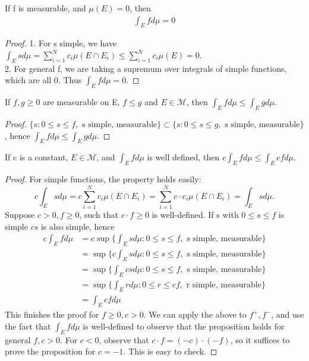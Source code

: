 \documentclass[11pt]{scrartcl}
\begin{document}
\begin{proposition}
If f is measurable, and $\mu(E)=0$, then 
\begin{align*}
\int_E f d\mu = 0 
\end{align*}
\end{proposition}

\begin{proof}
1. For s simple, we have $\int_E s d\mu = \sum_{i=1}^N c_i \mu(E\cap E_i) \leq \sum_{i=1}^N c_i \mu(E) = 0$.\\
2. For general f, we are taking a supremum over integrals of simple functions, which are all 0. Thus $\int_E f d\mu = 0 $.
\end{proof}

\begin{proposition}
If $f,g\geq 0$ are measurable on E, $f\leq g$ and $E\in \mathcal{M}$, then $\int_E f d\mu \leq \int_E g d\mu$.
\end{proposition}

\begin{proof}
$\{s: 0\leq s\leq f, \text{ s simple, measurable}\} \subset \{s: 0\leq s\leq g, \text{ s simple, measurable}\}$, hence $\int_E f d\mu \leq \int_E g d\mu$.
\end{proof}

\begin{proposition}
If c is a constant, $E\in \mathcal{M}$, and $\int_E f d\mu$ is well defined, then $c \int_E f d\mu \leq \int_E c f d\mu$.
\end{proposition}

\begin{proof}
For simple functions, the property holds easily: $$c \int_E s d\mu = c \sum_{i=1}^N c_i \mu(E\cap E_i) = \sum_{i=1}^N c\cdot c_i \mu(E\cap E_i) =\int_E s d\mu .$$
Suppose $c > 0, f\geq 0$, such that $c\cdot f\geq 0$ is well-defined. If s with $0\leq s \leq f$ is simple $cs$ is also simple, hence
\begin{align*}
c\int_E f d\mu & = c \sup \{ \int_E s d\mu: 0\leq s\leq f, \text{ s simple, measurable}\} \\
& = \sup \{ c \int_E s d\mu: 0\leq s\leq f, \text{ s simple, measurable}\} \\
& = \sup \{ \int_E cs d\mu: 0\leq s\leq f, \text{ s simple, measurable}\} \\
& = \sup \{ \int_E r d\mu: 0\leq r\leq cf, \text{ r simple, measurable}\} \\
& = \int_E cf d\mu
\end{align*}
This finishes the proof for $f\geq 0, c>0$. We can apply the above to $f^+,f^-$, and use the fact that $\int_E f d\mu$ is well-defined to observe that the proposition holds for general $f, c>0$.
For $c<0$, observe that $c\cdot f = (-c)\cdot (-f)$, so it suffices to prove the proposition for $c = -1$. This is easy to check.
\end{proof}
\end{document}
